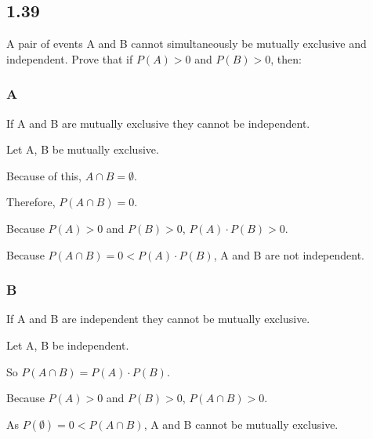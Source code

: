 \subsection*{1.39}

A pair of events A and B cannot simultaneously be mutually exclusive and independent. Prove that if $P(A) > 0$ and $P(B) > 0$, then:

\subsubsection*{A} If A and B are mutually exclusive they cannot be independent.

Let A, B be mutually exclusive. 

Because of this, $A \cap B = \emptyset$.

Therefore, $P(A \cap B) = 0$.

Because $P(A) > 0$ and $P(B) > 0$, $P(A) \cdot P(B) > 0$.

Because $P(A \cap B) = 0 < P(A) \cdot P(B)$, A and B are not independent.

\subsubsection*{B} If A and B are independent they cannot be mutually exclusive.

Let A, B be independent.

So $P(A \cap B) = P(A) \cdot P(B)$.

Because $P(A) > 0$ and $P(B) > 0$, $P(A \cap B) > 0$.

As $P(\emptyset) = 0 < P(A \cap B)$, A and B cannot be mutually exclusive.
